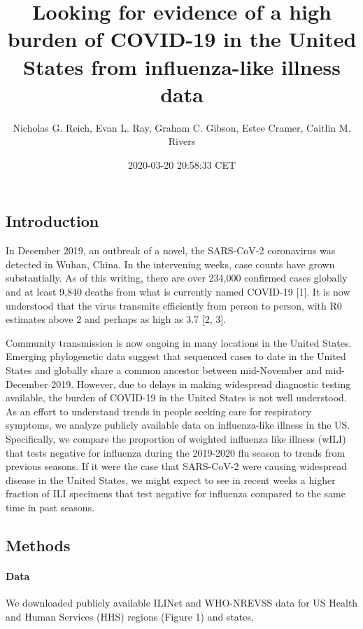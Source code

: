 \documentclass[]{article}
\title{Looking for evidence of a high burden of COVID-19 in the United States
from influenza-like illness data}
\author{Nicholas G. Reich, Evan L. Ray, Graham C. Gibson, Estee Cramer, Caitlin
M. Rivers}
\date{2020-03-20 20:58:33 CET}
\let\oldparagraph\paragraph
\renewcommand{\paragraph}[1]{\oldparagraph{#1}\mbox{}}
\begin{document}
\maketitle

\hypertarget{introduction}{%
\subsection{Introduction}\label{introduction}}

In December 2019, an outbreak of a novel, the SARS-CoV-2 coronavirus was
detected in Wuhan, China. In the intervening weeks, case counts have
grown substantially. As of this writing, there are over 234,000
confirmed cases globally and at least 9,840 deaths from what is
currently named COVID-19 {[}1{]}. It is now understood that the virus
transmits efficiently from person to person, with R0 estimates above 2
and perhaps as high as 3.7 {[}2, 3{]}.

Community transmission is now ongoing in many locations in the United
States. Emerging phylogenetic data suggest that sequenced cases to date
in the United States and globally share a common ancestor between
mid-November and mid-December 2019. However, due to delays in making
widespread diagnostic testing available, the burden of COVID-19 in the
United States is not well understood. As an effort to understand trends
in people seeking care for respiratory symptoms, we analyze publicly
available data on influenza-like illness in the US. Specifically, we
compare the proportion of weighted influenza like illness (wILI) that
tests negative for influenza during the 2019-2020 flu season to trends
from previous seasons. If it were the case that SARS-CoV-2 were causing
widespread disease in the United States, we might expect to see in
recent weeks a higher fraction of ILI specimens that test negative for
influenza compared to the same time in past seasons.

\hypertarget{methods}{%
\subsection{Methods}\label{methods}}

\hypertarget{data}{%
\paragraph{Data}\label{data}}

We downloaded publicly available ILINet and WHO-NREVSS data for US
Health and Human Services (HHS) regions (Figure 1) and states.
\end{document}
